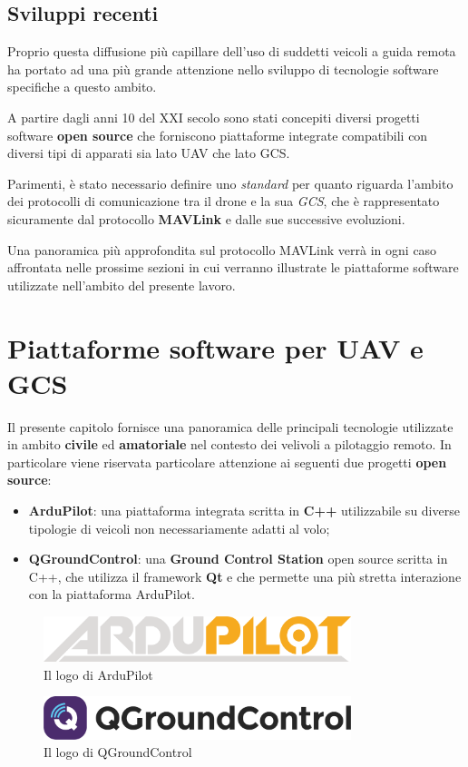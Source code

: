 \documentclass[a4paper, 12pt, oneside]{article}
\theoremstyle{definition}
\begin{document}
\subsection{Sviluppi recenti}
Proprio questa diffusione più capillare dell'uso di suddetti veicoli a guida remota ha portato ad una più grande attenzione nello sviluppo di tecnologie software specifiche a questo ambito. 

A partire dagli anni 10 del XXI secolo sono stati concepiti diversi progetti software \textbf{open source} che forniscono piattaforme integrate compatibili con diversi tipi di apparati sia lato UAV che lato GCS. 

Parimenti, è stato necessario definire uno \textit{standard} per quanto riguarda l'ambito dei protocolli di comunicazione tra il drone e la sua \textit{GCS}, che è rappresentato sicuramente dal protocollo \textbf{MAVLink} e dalle sue successive evoluzioni. 

Una panoramica più approfondita sul protocollo MAVLink verrà in ogni caso affrontata nelle prossime sezioni in cui verranno illustrate le piattaforme software utilizzate nell'ambito del presente lavoro.

\newpage

\section{Piattaforme software per UAV e GCS}
Il presente capitolo fornisce una panoramica delle principali tecnologie utilizzate in ambito \textbf{civile} ed \textbf{amatoriale} nel contesto dei velivoli a pilotaggio remoto. In particolare viene riservata particolare attenzione ai seguenti due progetti \textbf{open source}:

\begin{itemize}
    \item \textbf{ArduPilot}: una piattaforma integrata scritta in \textbf{C++} utilizzabile su diverse tipologie di veicoli non necessariamente adatti al volo;
    \item \textbf{QGroundControl}: una \textbf{Ground Control Station} open source scritta in C++, che utilizza il framework \textbf{Qt} e che permette una più stretta interazione con la piattaforma ArduPilot.
\end{itemize}

\begin{figure}[H]
    \centering
    \includegraphics[width=0.8\textwidth]{images/ardupilot_logo.png}
    \caption{Il logo di ArduPilot}
\end{figure}
\begin{figure}[H]
    \centering
    \includegraphics[width=0.8\textwidth]{images/QGC_RGB_Logo_Horizontal_Positive_PREFERRED.png}
    \caption{Il logo di QGroundControl}
\end{figure}
\end{document}
